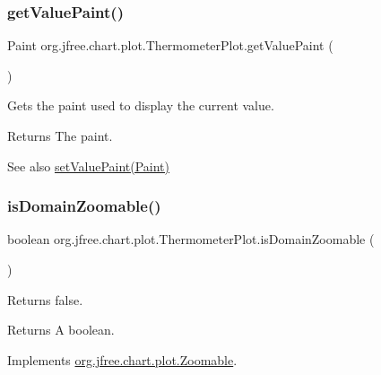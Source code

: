 \subsubsection{\texorpdfstring{get\+Value\+Paint()}{getValuePaint()}}
{\footnotesize\ttfamily Paint org.\+jfree.\+chart.\+plot.\+Thermometer\+Plot.\+get\+Value\+Paint (\begin{DoxyParamCaption}{ }\end{DoxyParamCaption})}

Gets the paint used to display the current value.

\begin{DoxyReturn}{Returns}
The paint.
\end{DoxyReturn}
\begin{DoxySeeAlso}{See also}
\mbox{\hyperlink{classorg_1_1jfree_1_1chart_1_1plot_1_1_thermometer_plot_a347f5e5511e843c2e496019c84c20fd9}{set\+Value\+Paint(\+Paint)}} 
\end{DoxySeeAlso}
\mbox{\label{classorg_1_1jfree_1_1chart_1_1plot_1_1_thermometer_plot_a6685f62ba19ca11218dc82abb997be1e}} 
\subsubsection{\texorpdfstring{is\+Domain\+Zoomable()}{isDomainZoomable()}}
{\footnotesize\ttfamily boolean org.\+jfree.\+chart.\+plot.\+Thermometer\+Plot.\+is\+Domain\+Zoomable (\begin{DoxyParamCaption}{ }\end{DoxyParamCaption})}

Returns {\ttfamily false}.

\begin{DoxyReturn}{Returns}
A boolean. 
\end{DoxyReturn}


Implements \mbox{\hyperlink{interfaceorg_1_1jfree_1_1chart_1_1plot_1_1_zoomable_a7c10a2f8573d8238ce31a4ee8d7dd2db}{org.\+jfree.\+chart.\+plot.\+Zoomable}}.

\mbox{\label{classorg_1_1jfree_1_1chart_1_1plot_1_1_thermometer_plot_adc804a5ef2e701dfaf6911c33bd178f3}} 
